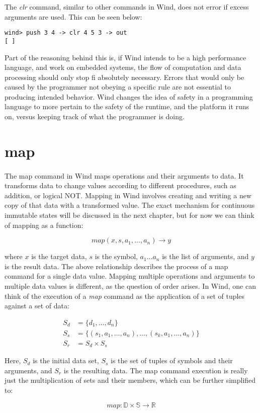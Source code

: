 \par The \emph{clr} command, similar to other commands in Wind, does not error if excess arguments are used. This can be seen below:

\begin{verbatim}
wind> push 3 4 -> clr 4 5 3 -> out
[ ]
\end{verbatim}

\par Part of the reasoning behind this is, if Wind intends to be a high performance language, and work on embedded systems, the flow of computation and data processing should only stop fi absolutely necessary. Errors that would only be caused by the programmer not obeying a specific rule  are not essential to producing intended behavior. Wind changes the idea of safety in a programming language to more pertain to the safety of the runtime, and the platform it runs on, versus keeping track of what the programmer is doing.

\section{map}

\paragraph{  } The map command in Wind maps operations and their arguments to data. It transforms data to change values according to different procedures, such as addition, or logical NOT. Mapping in Wind involves creating and writing a new copy of that data with a transformed value. The exact mechanism for continuous immutable states will be discussed in the next chapter, but for now we can think of mapping as a function:

$$
map(x, s, a_1, \dots, a_n) \longrightarrow y
$$

where $x$ is the target data, $s$ is the symbol, $a_1 \dots a_n$ is the list of arguments, and $y$ is the result data. The above relationship describes the process of a map command for a single data value. Mapping multiple operations and arguments to multiple data values is different, as the question of order arises. In Wind, one can think of the execution of a \emph{map} command as the application of a set of tuples against a set of data:

\begin{align*}
 S_d &= \{d_1,\dots,d_n\} \\
 S_s &= \{ (s_1, a_1,\dots,a_n), \dots,  (s_k, a_1,\dots,a_n)\} \\
 S_r &= S_d \times S_s
\end{align*}

Here, $S_d$ is the initial data set, $S_s$ is the set of tuples of symbols and their arguments, and $S_r$ is the resulting data. The map command execution is really just the multiplication of sets and their members, which can be further simplified to:

$$
map : \mathbb{D} \times \mathbb{S} \longrightarrow \mathbb{R}
$$

